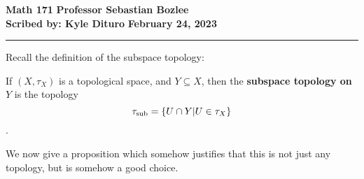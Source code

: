 \documentclass[12pt, twosided]{article}
\begin{document}
\noindent \textbf{Math 171} \hfill \textbf{Professor Sebastian Bozlee} \\
\textbf{Scribed by: Kyle Dituro} \hfill \textbf{February 24, 2023}\hrule
\vspace{.2in}

Recall the definition of the subspace topology:

\begin{df}
  If \((X, \tau_X)\) is a topological space, and \(Y \subseteq X\), then the \textbf{subspace topology on }\(Y\) is the topology \[\tau_{\text{sub}} = \left\{ U \cap Y \middle\vert U \in \tau_X \right\}\].
\end{df}

We now give a proposition which somehow justifies that this is not just any topology, but is somehow a good choice.
\end{document}
